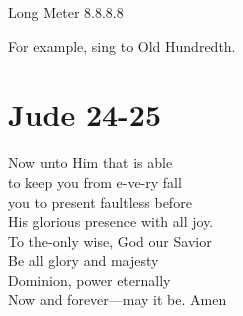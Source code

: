 \documentclass{article}
\begin{document}
\noindent Long Meter 8.8.8.8

\noindent For example, sing to Old Hundredth.

\section*{Jude 24-25}

 Now unto Him that is able\\
to keep you from e-ve-ry fall\\
you to present faultless before\\
His glorious presence with all joy.\\

 To the-only wise, God our Savior\\
Be all glory and majesty\\
Dominion, power eternally\\
Now and forever---may it be. Amen\\
\end{document}

